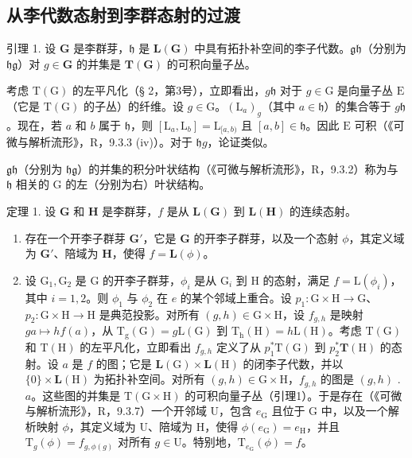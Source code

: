 \subsection{从李代数态射到李群态射的过渡}

引理 1. 设 \(\mathbf{G}\) 是李群芽，\(\mathfrak{h}\) 是 \(\mathbf{L}(\mathbf{G})\) 中具有拓扑补空间的李子代数。\(\mathfrak{gh}\)（分别为 \(\mathfrak{hg}\)）对 \(g\in\mathbf{G}\) 的并集是 \(\mathbf{T}(\mathbf{G})\) 的可积向量子丛。

考虑 \(\mathrm{T}(\mathrm{G})\) 的左平凡化（§ 2，第3号），立即看出，\(g\mathfrak{h}\) 对于 \(g\in \mathrm{G}\) 是向量子丛 \(\mathrm{E}\)（它是 \(\mathrm{T}(\mathrm{G})\) 的子丛）的纤维。设 \(g\in \mathrm{G}\)。\((\mathrm{L}_a)_g\)（其中 \(a\in \mathfrak{h}\)）的集合等于 \(g\mathfrak{h}\)。现在，若 \(a\) 和 \(b\) 属于 \(\mathfrak{h}\)，则 \([\mathrm{L}_a,\mathrm{L}_b] = \mathrm{L}_{[a,b)}\) 且 \([a,b]\in \mathfrak{h}\)。因此 \(\mathrm{E}\) 可积（《可微与解析流形》，R，9.3.3 (iv)）。对于 \(\mathfrak{h}g\)，论证类似。

\(\mathfrak{gh}\)（分别为 \(\mathfrak{hg}\)）的并集的积分叶状结构（《可微与解析流形》，R，9.3.2）称为与 \(\mathfrak{h}\) 相关的 G 的左（分别为右）叶状结构。

定理 1. 设 \(\mathbf{G}\) 和 \(\mathbf{H}\) 是李群芽，\(f\) 是从 \(\mathbf{L}(\mathbf{G})\) 到 \(\mathbf{L}(\mathbf{H})\) 的连续态射。

\begin{enumerate}
\def\labelenumi{(\roman{enumi})}
\item
  存在一个开李子群芽 \(\mathbf{G}'\)，它是 \(\mathbf{G}\) 的开李子群芽，以及一个态射 \(\phi\)，其定义域为 \(\mathbf{G}'\)、陪域为 \(\mathbf{H}\)，使得 \(f = \mathbf{L}(\phi)\)。
\item
  设 \(\mathrm{G}_1, \mathrm{G}_2\) 是 G 的开李子群芽，\(\phi_i\) 是从 \(\mathrm{G}_i\) 到 H 的态射，满足 \(f = \mathrm{L}(\phi_i)\)，其中 \(i = 1, 2\)。则 \(\phi_1\) 与 \(\phi_2\) 在 \(e\) 的某个邻域上重合。设 \(p_1: \mathrm{G} \times \mathrm{H} \to \mathrm{G}\)、\(p_2: \mathrm{G} \times \mathrm{H} \to \mathrm{H}\) 是典范投影。对所有 \((g,h) \in \mathrm{G} \times \mathrm{H}\)，设 \(f_{g,h}\) 是映射 \(ga \mapsto hf(a)\)，从 \(\mathrm{T_g(G)} = g\mathrm{L(G)}\) 到 \(\mathrm{T_h(H)} = h\mathrm{L(H)}\)。考虑 \(\mathrm{T(G)}\) 和 \(\mathrm{T(H)}\) 的左平凡化，立即看出 \(f_{g,h}\) 定义了从 \(p_1^*\mathrm{T(G)}\) 到 \(p_{2}^{*}\mathbf{T}(\mathrm{H})\) 的态射。设 \(a\) 是 \(f\) 的图；它是 \(\mathbf{L}(\mathrm{G}) \times \mathbf{L}(\mathrm{H})\) 的闭李子代数，并以 \(\{0\} \times \mathbf{L}(\mathrm{H})\) 为拓扑补空间。对所有 \((g,h) \in \mathrm{G} \times \mathrm{H}\)，\(f_{g,h}\) 的图是 \((g,h)\) . \(a\)。这些图的并集是 \(\mathrm{T}(\mathrm{G} \times \mathrm{H})\) 的可积向量子丛（引理1）。于是存在（《可微与解析流形》，R，9.3.7）一个开邻域 \(\mathrm{U}\)，包含 \(e_{\mathrm{G}}\) 且位于 \(\mathrm{G}\) 中，以及一个解析映射 \(\phi\)，其定义域为 \(\mathrm{U}\)、陪域为 \(\mathrm{H}\)，使得 \(\phi(e_{\mathrm{G}}) = e_{\mathrm{H}}\)，并且 \(\mathrm{T}_{g}(\phi) = f_{g,\phi(g)}\) 对所有 \(g \in \mathrm{U}\)。特别地，\(\mathrm{T}_{e_{\mathrm{G}}}(\phi) = f\)。
\end{enumerate}

